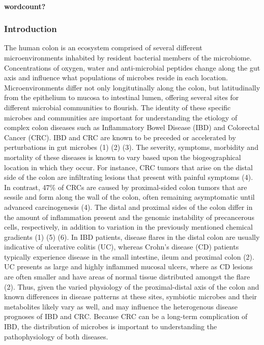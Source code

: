 \documentclass[11pt,]{article}
\let\oldparagraph\paragraph
\renewcommand{\paragraph}[1]{\oldparagraph{#1}\mbox{}}
\begin{document}
\paragraph{wordcount?}\label{wordcount}

\subsubsection{Introduction}\label{introduction}

The human colon is an ecosystem comprised of several different
microenvironments inhabited by resident bacterial members of the
microbiome. Concentrations of oxygen, water and anti-microbial peptides
change along the gut axis and influence what populations of microbes
reside in each location. Microenvironments differ not only
longitutinally along the colon, but latitudinally from the epithelium to
mucosa to intestinal lumen, offering several sites for different
microbial communities to flourish. The identity of these specific
microbes and communities are important for understanding the etiology of
complex colon diseases such as Inflammatory Bowel Disease (IBD) and
Colorectal Cancer (CRC). IBD and CRC are known to be preceded or
accelerated by perturbations in gut microbes (1) (2) (3). The severity,
symptoms, morbidity and mortality of these diseases is known to vary
based upon the biogeographical location in which they occur. For
instance, CRC tumors that arise on the distal side of the colon are
infiltrating lesions that present with painful symptoms (4). In
contrast, 47\% of CRCs are caused by proximal-sided colon tumors that
are sessile and form along the wall of the colon, often remaining
asymptomatic until advanced carcinogenesis (4). The distal and proximal
sides of the colon differ in the amount of inflammation present and the
genomic instability of precancerous cells, respectively, in addition to
variation in the previously mentioned chemical gradients (1) (5) (6). In
IBD patients, disease flares in the distal colon are usually indicative
of ulcerative colitis (UC), whereas Crohn's disease (CD) patients
typically experience disease in the small intestine, ileum and proximal
colon (2). UC presents as large and highly inflammed mucosal ulcers,
where as CD lesions are often smaller and have areas of normal tissue
distributed amongst the flare (2). Thus, given the varied physiology of
the proximal-distal axis of the colon and known differences in disease
patterns at these sites, symbiotic microbes and their metabolites likely
vary as well, and may influence the heterogenous disease prognoses of
IBD and CRC. Because CRC can be a long-term complication of IBD, the
distribution of microbes is important to understanding the
pathophysiology of both diseases.
\end{document}
